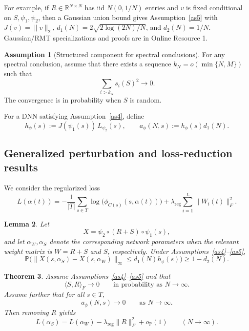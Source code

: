 \documentclass[11pt]{article}
\theoremstyle{plain}
\newtheorem{thm}{Theorem}[section]
\newtheorem{lem}[thm]{Lemma}
\theoremstyle{definition}
\newtheorem{assumption}[thm]{Assumption}
\theoremstyle{remark}
\newcommand{\PP}{\mathbb{P}}
\newcommand{\1}{\mathbf{1}}
\begin{document}
For example, if \(R\in\mathbb R^{N\times N}\) has iid \(N(0,1/N)\) entries and \(v\) is fixed conditional on \(S,\psi_1,\psi_2\), then a Gaussian union bound gives Assumption~\ref{as5} with \(J(v)=\|v\|_2\), \(d_1(N)=2\sqrt{2\log(2N)/N}\), and \(d_2(N)=1/N\). Gaussian/RMT specializations and proofs are in Online Resource 1.

\begin{assumption}[Structured component for spectral conclusions]
\label{as6}
For any spectral conclusion, assume that there exists a sequence \(k_N=o(\min\{N,M\})\) such that
\[
\sum_{i>k_N}s_i(S)^2\to0.
\]
The convergence is in probability when \(S\) is random.
\end{assumption}

For a DNN satisfying Assumption~\ref{as4}, define
\begin{equation}
\label{from_DNN_st_2}
h_\phi(s):=J(\psi_1(s))\,L_{\psi_2}(s),
\qquad
a_\phi(N,s):=h_\phi(s)d_1(N).
\end{equation}

\subsection{Generalized perturbation and loss-reduction results}
\label{decrease_in_loss}

We consider the regularized loss
\begin{equation}
\label{loss_noise_det_2}
L(\alpha(t))
=
-\frac{1}{|T|}\sum_{s\in T}\log\big(\phi_{C(s)}(s,\alpha(t))\big)
+
\lambda_{\mathrm{reg}}
\sum_{i=1}^{L}\|W_i(t)\|_F^2.
\end{equation}

\begin{lem}
\label{lem:remove_R_general}
Let
\[
X=\psi_2\circ (R+S)\circ \psi_1(s),
\]
and let \(\alpha_W,\alpha_S\) denote the corresponding network parameters when the relevant weight matrix is \(W=R+S\) and \(S\), respectively. Under Assumptions~\ref{as4}--\ref{as5},
\[
\PP\Big(
\|X(s,\alpha_S)-X(s,\alpha_W)\|_\infty
\le d_1(N)h_\phi(s)
\Big)
\ge 1-d_2(N).
\]
\end{lem}

\begin{thm}
\label{theorem_reduction_of_loss_general}
Assume Assumptions~\ref{as4}--\ref{as5} and that
\[
\langle S,R\rangle_F\to0
\qquad\text{in probability as }N\to\infty.
\]
Assume further that for all \(s\in T\),
\[
a_\phi(N,s)\to0
\qquad\text{as }N\to\infty.
\]
Then removing \(R\) yields
\[
L(\alpha_S)=L(\alpha_W)-\lambda_{\mathrm{reg}}\|R\|_F^2+o_{\PP}(1)
\qquad(N\to\infty).
\]
\end{thm}
\end{document}

